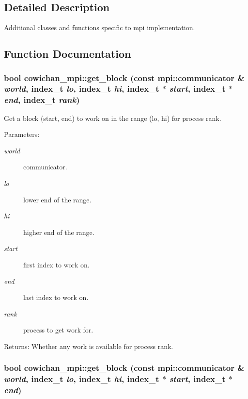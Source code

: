 \subsection{Detailed Description}
Additional classes and functions specific to mpi implementation. 



\subsection{Function Documentation}
\hypertarget{namespacecowichan__mpi_413bf41c8bf73b560d1c16a8e5206e5f}{
\subsubsection[{get\_\-block}]{\setlength{\rightskip}{0pt plus 5cm}bool cowichan\_\-mpi::get\_\-block (const mpi::communicator \& {\em world}, \/  {\bf index\_\-t} {\em lo}, \/  {\bf index\_\-t} {\em hi}, \/  {\bf index\_\-t} $\ast$ {\em start}, \/  {\bf index\_\-t} $\ast$ {\em end}, \/  {\bf index\_\-t} {\em rank})}}
\label{namespacecowichan__mpi_413bf41c8bf73b560d1c16a8e5206e5f}


Get a block (start, end) to work on in the range (lo, hi) for process rank. \begin{Desc}
\item[Parameters:]
\begin{description}
\item[{\em world}]communicator. \item[{\em lo}]lower end of the range. \item[{\em hi}]higher end of the range. \item[{\em start}]first index to work on. \item[{\em end}]last index to work on. \item[{\em rank}]process to get work for. \end{description}
\end{Desc}
\begin{Desc}
\item[Returns:]Whether any work is available for process rank. \end{Desc}
\hypertarget{namespacecowichan__mpi_bb7c07d8b23660efe06c7ee12d60bbdc}{
\subsubsection[{get\_\-block}]{\setlength{\rightskip}{0pt plus 5cm}bool cowichan\_\-mpi::get\_\-block (const mpi::communicator \& {\em world}, \/  {\bf index\_\-t} {\em lo}, \/  {\bf index\_\-t} {\em hi}, \/  {\bf index\_\-t} $\ast$ {\em start}, \/  {\bf index\_\-t} $\ast$ {\em end})}}
\label{namespacecowichan__mpi_bb7c07d8b23660efe06c7ee12d60bbdc}


